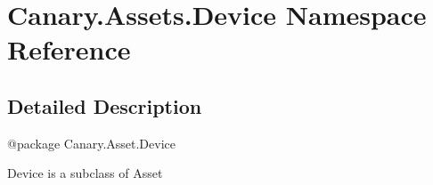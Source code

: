 \hypertarget{namespace_canary_1_1_assets_1_1_device}{\section{Canary.\-Assets.\-Device Namespace Reference}
\label{namespace_canary_1_1_assets_1_1_device}
}


\subsection{Detailed Description}
\begin{DoxyVerb}@package Canary.Asset.Device

Device is a subclass of Asset
\end{DoxyVerb}
 